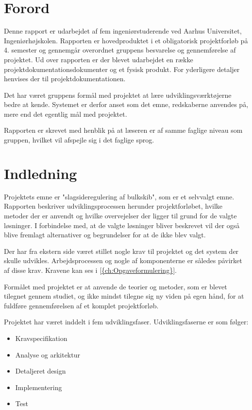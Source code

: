 \chapter{Forord}
\label{ch:forord}
Denne rapport er udarbejdet af fem ingeniørstuderende ved Aarhus Universitet, Ingeniørhøjskolen. Rapporten er hovedproduktet i et obligatorisk projektforløb på 4. semester og gennemgår overordnet gruppens besvarelse og gennemførelse af projektet. Ud over rapporten er der blevet udarbejdet en række projektdokumentationsdokumenter og et fysisk produkt. For yderligere detaljer henvises der til projektdokumentationen.

Det har været gruppens formål med projektet at lære udviklingsværktøjerne bedre at kende. Systemet er derfor anset som det emne, redskaberne anvendes på, mere end det egentlig mål med projektet.
 
Rapporten er skrevet med henblik på at læseren er af samme faglige niveau som gruppen, hvilket vil afspejle sig i det faglige sprog. 

\chapter{Indledning}
Projektets emne er "slagsideregulering af bulkskib", som er et selvvalgt emne. Rapporten beskriver udviklingsprocessen herunder projektforløbet, hvilke metoder der er anvendt og hvilke overvejelser der ligger til grund for de valgte løsninger. I forbindelse med, at de valgte løsninger bliver beskrevet vil der også blive fremlagt alternativer og begrundelser for at de ikke blev valgt. 

Der har fra ekstern side været stillet nogle krav til projektet og det system der skulle udvikles. Arbejdsprocessen og nogle af komponenterne er således påvirket af disse krav. Kravene kan ses i \ref{{ch:Opgaveformulering}}.

Formålet med projektet er at anvende de teorier og metoder, som er blevet tilegnet gennem studiet, og ikke mindst tilegne sig ny viden på egen hånd, for at fuldføre gennemførelsen af et komplet projektforløb.

Projektet har været inddelt i fem udviklingsfaser. Udviklingsfaserne er som følger:
\begin{itemize}
\item Kravspecifikation
\item Analyse og arkitektur
\item Detaljeret design
\item Implementering
\item Test
\end{itemize}


